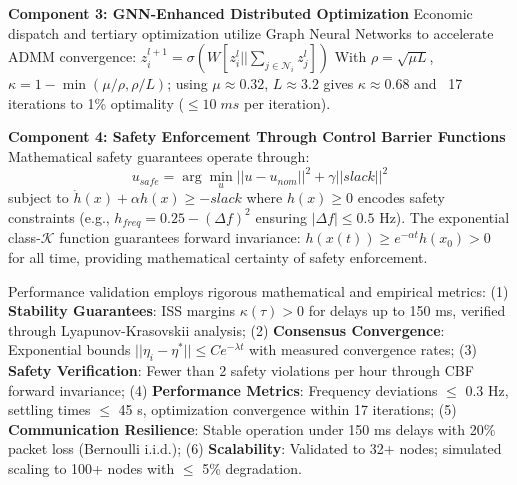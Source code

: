 \documentclass[12pt]{article}
\begin{document}
\textbf{Component 3: GNN-Enhanced Distributed Optimization}
Economic dispatch and tertiary optimization utilize Graph Neural Networks to accelerate ADMM convergence:
$z_i^{l+1} = \sigma(W[z_i^l || \sum_{j \in \mathcal{N}_i} z_j^l])$
With $\rho = \sqrt{\mu L}$, $\kappa = 1 - \min(\mu/\rho, \rho/L)$; using $\mu \approx 0.32$, $L \approx 3.2$ gives $\kappa \approx 0.68$ and ~17 iterations to 1\% optimality ($\leq 10\;ms$ per iteration).

\textbf{Component 4: Safety Enforcement Through Control Barrier Functions}
Mathematical safety guarantees operate through:
$$u_{safe} = \arg\min_u ||u - u_{nom}||^2 + \gamma||slack||^2$$
subject to $\dot{h}(x) + \alpha h(x) \geq -slack$
where $h(x) \geq 0$ encodes safety constraints (e.g., $h_{freq} = 0.25 - (\Delta f)^2$ ensuring $|\Delta f| \leq 0.5$ Hz). The exponential class-$\mathcal{K}$ function guarantees forward invariance: $h(x(t)) \geq e^{-\alpha t}h(x_0) > 0$ for all time, providing mathematical certainty of safety enforcement.

Performance validation employs rigorous mathematical and empirical metrics: (1) \textbf{Stability Guarantees}: ISS margins $\kappa(\tau) > 0$ for delays up to 150 ms, verified through Lyapunov-Krasovskii analysis; (2) \textbf{Consensus Convergence}: Exponential bounds $||\eta_i - \eta^*|| \leq Ce^{-\lambda t}$ with measured convergence rates; (3) \textbf{Safety Verification}: Fewer than 2 safety violations per hour through CBF forward invariance; (4) \textbf{Performance Metrics}: Frequency deviations $\leq$ 0.3 Hz, settling times $\leq$ 45 s, optimization convergence within 17 iterations; (5) \textbf{Communication Resilience}: Stable operation under 150 ms delays with 20\% packet loss (Bernoulli i.i.d.); (6) \textbf{Scalability}: Validated to 32+ nodes; simulated scaling to 100+ nodes with $\leq$ 5\% degradation.
\end{document}
